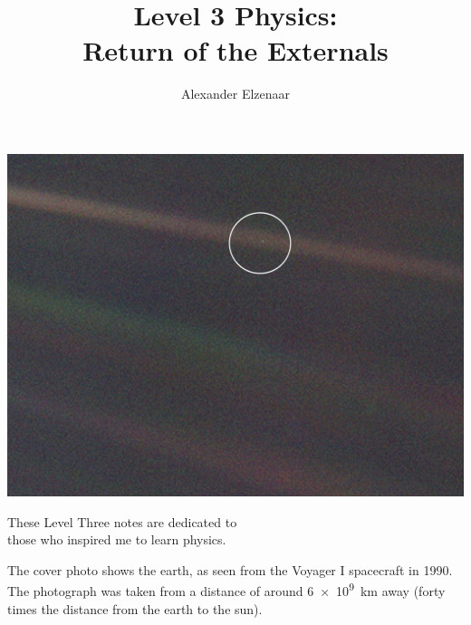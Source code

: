 \documentclass[a4paper]{amsbook}
\title[Level 3 Physics]{Level 3 Physics:\\Return of the Externals}
\author{Alexander Elzenaar}
\theoremstyle{definition}
\numberwithin{exercise}{chapter}
\numberwithin{exercise}{chapter}
\begin{document}
\begin{titlepage}
  \centering

  \makeatletter
  \vspace*{2cm}

  \includegraphics[width=\textwidth]{cover}

  \vspace*{\fill}

  \Huge{\textbf{\@title}}

  \vspace*{1cm}

  \Large\textit{\authors}

  \vspace*{\fill}

  \makeatother
\end{titlepage}


\cleardoublepage
\thispagestyle{empty}\mbox{}
\clearpage
\thispagestyle{empty}
\vspace*{13.5pc}
\begin{center}
  These Level Three notes are dedicated to\\[2pt] those who inspired me to learn physics.
\end{center}
\vspace*{\fill}
\begin{center}
  The cover photo shows the earth, as seen from the Voyager I spacecraft in 1990. The photograph was taken from a
  distance of around \SI{6e9}{\kilo\metre} away (forty times the distance from the earth to the sun).
\end{center}
\vspace*{6.75pc}
\cleardoublepage
\end{document}
